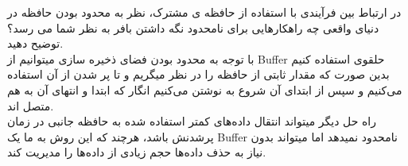 \documentclass[]{article}
\begin{document}
در ارتباط بین فرآیندی با استفاده از حافظه ی مشترک، نظر به محدود بودن حافظه در دنیای واقعی چه راهکارهایی برای نامحدود نگه
داشتن بافر به نظر شما می رسد؟ توضیح دهید.
\\
با توجه به محدود بودن فضای ذخیره سازی میتوانیم از
Buffer
حلقوی استفاده کنیم بدین صورت که مقدار ثابتی از حافظه را در نظر میگریم و تا پر شدن از آن
استفاده می‌کنیم و سپس از ابتدای آن شروع به نوشتن می‌کنیم انگار که ابتدا و انتهای آن به هم متصل اند.
\\
راه حل دیگر میتواند انتقال داده‌های کمتر استفاده شده
به حافظه جانبی در زمان پرشدنش باشد، هرچند که این روش به ما یک
Buffer
نامحدود نمیدهد اما میتواند بدون نیاز به حذف داده‌ها حجم زیادی از داده‌ها را مدیریت کند.
\end{document}
